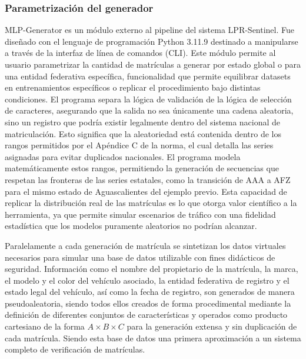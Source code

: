 \subsubsection*{Parametrización del generador}
MLP-Generator es un módulo externo al pipeline del sistema LPR-Sentinel. Fue diseñado con el lenguaje de programación Python 3.11.9 destinado a manipularse a través de la interfaz de línea de comandos (CLI). Este módulo permite al usuario parametrizar la cantidad de matrículas a generar por estado global o para una entidad federativa específica, funcionalidad que permite equilibrar datasets en entrenamientos específicos o replicar el procedimiento bajo distintas condiciones. El programa separa la lógica de validación de la lógica de selección de caracteres, asegurando que la salida no sea únicamente una cadena aleatoria, sino un registro que podría existir legalmente dentro del sistema nacional de matriculación. %
Esto significa que la aleatoriedad está contenida dentro de los rangos permitidos por el Apéndice C de la norma, el cual detalla las series asignadas para evitar duplicados nacionales. El programa modela matemáticamente estos rangos, permitiendo la generación de secuencias que respetan las fronteras de las series estatales, como la transición de AAA a AFZ para el mismo estado de Aguascalientes del ejemplo previo. Esta capacidad de replicar la distribución real de las matrículas es lo que otorga valor científico a la herramienta, ya que permite simular escenarios de tráfico con una fidelidad estadística que los modelos puramente aleatorios no podrían alcanzar.

Paralelamente a cada generación de matrícula se sintetizan los datos virtuales necesarios para simular una base de datos utilizable con fines didácticos de seguridad. Información como el nombre del propietario de la matrícula, la marca, el modelo y el color del vehículo asociado, la entidad federativa de registro y el estado legal del vehículo, así como la fecha de registro, son generados de manera pseudoaleatoria, siendo todos ellos creados de forma procedimental mediante la definición de diferentes conjuntos de características y operados como producto cartesiano de la forma $A \times B \times C$ para la generación extensa y sin duplicación de cada matrícula. Siendo esta base de datos una primera aproximación a un sistema completo de verificación de matrículas.

